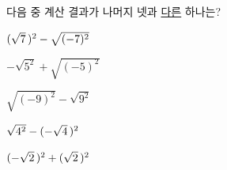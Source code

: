 다음 중 계산 결과가 나머지 넷과 \underline{다른} 하나는?
\begin{choicesii}{\rule[-3ex]{0pt}{8ex}$(\sqrt{7}\mkern3mu )^2-\sqrt{(-7)^2}$}{\rule[-3ex]{0pt}{8ex}$-\sqrt{5^2}+\sqrt{(-5)^2}$}{\rule[-3ex]{0pt}{8ex}$\sqrt{(-9)^2}-\sqrt{9^2}$}{\rule[-3ex]{0pt}{8ex}$\sqrt{4^2}-(-\sqrt{4}\mkern3mu )^2$}{\rule[-3ex]{0pt}{8ex}$(-\sqrt{2}\mkern3mu )^2+(\sqrt{2}\mkern3mu )^2$}\end{choicesii}
